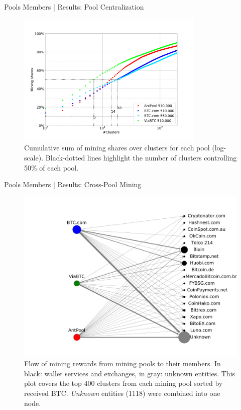 \documentclass[10pt]{beamer}
\begin{document}
\begin{frame}[fragile]{Pools Members | Results: Pool Centralization}
    \begin{figure}
        \includegraphics[width=0.8\textwidth]{images/pool_centralization.pdf}
        \caption{Cumulative sum of mining shares over clusters for each pool (log-scale). Black-dotted lines highlight the number of clusters controlling 50\% of each pool.} \label{fig:pool_centralization}
    \end{figure}
\end{frame}


\begin{frame}[fragile]{Pools Members | Results: Cross-Pool Mining}
    \begin{figure}
        \includegraphics[width=0.7\columnwidth]{images/payments_graph_400.pdf}
        \caption{Flow of mining rewards from mining pools to their members. In black: wallet services and exchanges, in gray: unknown entities. This plot covers the top 400 clusters from each mining pool sorted by received BTC. \textit{Unknown} entities (1118) were combined into one node.}
        \label{fig:payment_graph}
    \end{figure}
\end{frame}
\end{document}
